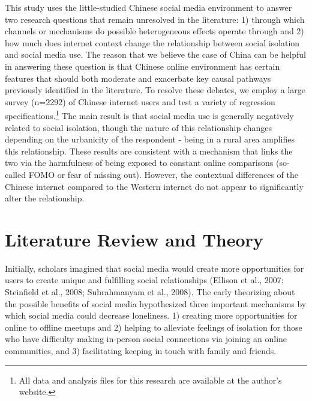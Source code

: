 \documentclass[]{interact}
\theoremstyle{plain}%
\theoremstyle{definition}
\theoremstyle{remark}
\begin{document}
This study uses the little-studied Chinese social media environment to
answer two research questions that remain unresolved in the literature:
1) through which channels or mechanisms do possible heterogeneous
effects operate through and 2) how much does internet context change the
relationship between social isolation and social media use. The reason
that we believe the case of China can be helpful in answering these
question is that Chinese online environment has certain features that
should both moderate and exacerbate key causal pathways previously
identified in the literature. To resolve these debates, we employ a
large survey (n=2292) of Chinese internet users and test a variety of
regression specifications.\footnote{All data and analysis files for this
  research are available at the author's website.} The main result is
that social media use is generally negatively related to social
isolation, though the nature of this relationship changes depending on
the urbanicity of the respondent - being in a rural area amplifies this
relationship. These results are consistent with a mechanism that links
the two via the harmfulness of being exposed to constant online
comparisons (so-called FOMO or fear of missing out). However, the
contextual differences of the Chinese internet compared to the Western
internet do not appear to significantly alter the relationship.

\section{Literature Review and
Theory}\label{literature-review-and-theory}

Initially, scholars imagined that social media would create more
opportunities for users to create unique and fulfilling social
relationships (Ellison et al., 2007; Steinfield et al., 2008;
Subrahmanyam et al., 2008). The early theorizing about the possible
benefits of social media hypothesized three important mechanisms by
which social media could decrease loneliness. 1) creating more
opportunities for online to offline meetups and 2) helping to alleviate
feelings of isolation for those who have difficulty making in-person
social connections via joining an online communities, and 3)
facilitating keeping in touch with family and friends.
\end{document}
